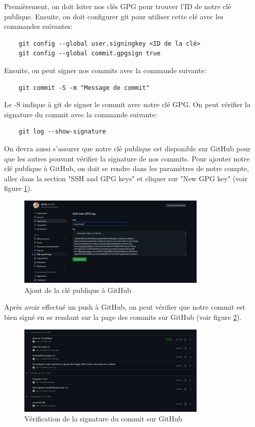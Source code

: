 \documentclass[12pt,a4paper]{article}
\begin{document}
Premièrement, on doit lsiter nos clés GPG pour trouver l'ID de notre clé publique.
Ensuite, on doit configurer git pour utiliser cette clé avec les commandes suivantes:
\begin{verbatim}
    git config --global user.signingkey <ID de la clé>
    git config --global commit.gpgsign true
\end{verbatim}

Ensuite, on peut signer nos commits avec la commande suivante:
\begin{verbatim}
    git commit -S -m "Message de commit"
\end{verbatim}

Le -S indique à git de signer le commit avec notre clé GPG.
On peut vérifier la signature du commit avec la commande suivante:
\begin{verbatim}
    git log --show-signature
\end{verbatim}

On devra aussi s'assurer que notre clé publique est disponible sur GitHub pour que les autres
pouvant vérifier la signature de nos commits.
Pour ajouter notre clé publique à GitHub, on doit se rendre dans les paramètres de notre compte,
aller dans la section "SSH and GPG keys" et cliquer sur "New GPG key" (voir figure \ref{gitGPG}).

\begin{figure}
    \centering
    \includegraphics[width=0.8\textwidth]{../img/gitGPG.png}
    \caption{Ajout de la clé publique à GitHub}
    \label{gitGPG}
\end{figure}

Après avoir effectué un push à GitHub, on peut vérifier que notre commit est bien signé
en se rendant sur la page des commits sur GitHub (voir figure \ref{gitGPGVerif}).
\begin{figure}
    \centering
    \includegraphics[width=0.8\textwidth]{../img/githubVerified.png}
    \caption{Vérification de la signature du commit sur GitHub}
    \label{gitGPGVerif}
\end{figure}
\end{document}
